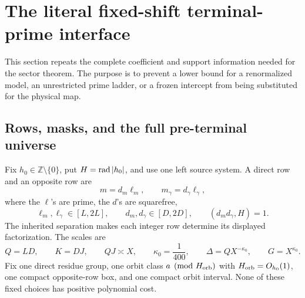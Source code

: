 \section{The literal fixed-shift terminal-prime interface}
\label{sec:literal-interface}

This section repeats the complete coefficient and support information needed
for the sector theorem.  The purpose is to prevent a lower bound for a
renormalized model, an unrestricted prime ladder, or a frozen intercept from
being substituted for the physical map.

\subsection{Rows, masks, and the full pre-terminal universe}

Fix \(h_0\in\mathbb Z\setminus\{0\}\), put \(H=\operatorname{rad}|h_0|\), and use one
left source system.  A direct row and an opposite row are
\begin{equation}
 m=d_m\ell_m,
 \qquad
 m_\gamma=d_\gamma\ell_\gamma,
 \label{eq:tpc56-two-rows}
\end{equation}
where the \(\ell\)'s are prime, the \(d\)'s are squarefree,
\begin{equation}
 \ell_m,\ell_\gamma\in[L,2L],
 \qquad
 d_m,d_\gamma\in[D,2D],
 \qquad
 (d_m d_\gamma,H)=1.
 \label{eq:tpc56-row-support}
\end{equation}
The inherited separation makes each integer row determine its displayed
factorization.  The scales are
\begin{equation}
 Q=LD,\qquad K=DJ,\qquad QJ\asymp X,\qquad
 \kappa_0=\frac1{400},\qquad
 \Delta=QX^{-\kappa_0},\qquad G=X^{\kappa_0}.
 \label{eq:tpc56-scales}
\end{equation}
Fix one direct residue group, one orbit class
\(a\pmod {H_{\rm orb}}\) with \(H_{\rm orb}=O_{h_0}(1)\), one compact
opposite-row box, and one compact orbit interval.  None of these fixed
choices has positive polynomial cost.

